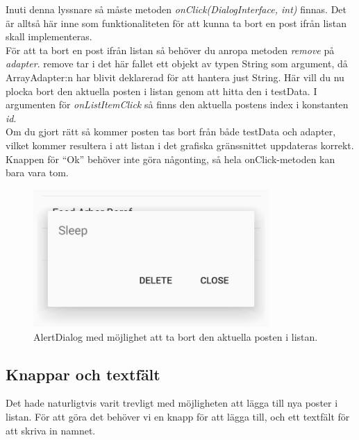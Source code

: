 \documentclass[11 pt, titlepage]{article} %
\begin{document}
Inuti denna lyssnare så måste metoden \textit{onClick(DialogInterface, int)} finnas. Det är alltså här inne som funktionaliteten för att kunna ta bort en post ifrån listan skall implementeras.\\

För att ta bort en post ifrån listan så behöver du anropa metoden \textit{remove} på \textit{adapter}.
remove tar i det här fallet ett objekt av typen String som argument, då ArrayAdapter:n har blivit deklarerad för att hantera just String.
Här vill du nu plocka bort den aktuella posten i listan genom att hitta den i testData.
I argumenten för \textit{onListItemClick} så finns den aktuella postens index i konstanten \textit{id}.\\ 
Om du gjort rätt så kommer posten tas bort från både testData och adapter, vilket kommer resultera i att listan i det grafiska gränssnittet uppdateras korrekt.\\

Knappen för “Ok” behöver inte göra någonting, så hela onClick-metoden kan bara vara tom.\\

\begin{figure}[ht!]

\centering

\includegraphics[width=90mm]{images/popup.png}

\caption{AlertDialog med möjlighet att ta bort den aktuella posten i listan.}

\label{overflow}

\end{figure}


\subsection{Knappar och textfält}
Det hade naturligtvis varit trevligt med möjligheten att lägga till nya poster i listan.
För att göra det behöver vi en knapp för att lägga till, och ett textfält för att skriva in namnet.\\
\end{document}
